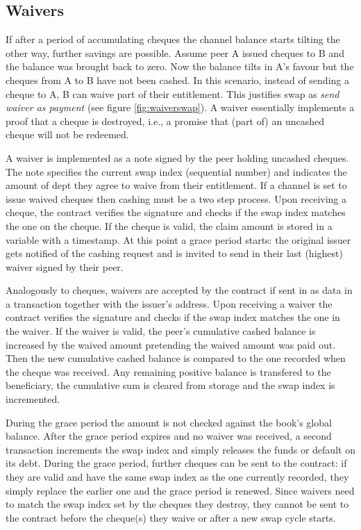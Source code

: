 \documentclass[a4paper,10pt]{article}
\begin{document}
\subsection{Waivers}

If after a period of accumulating cheques the channel balance starts tilting the other way,
further savings are possible.
Assume peer A issued cheques to B and the balance was brought back to zero.
Now the balance tilts in A's favour but the cheques from A to B have not been cashed.
In this scenario, instead of sending a cheque to A, B can waive part of their entitlement.
This justifies swap as \emph{send waiver as payment} (see figure \ref{fig:waiverswap}).
A waiver essentially implements a proof that a cheque is destroyed, i.e., a promise
that (part of) an uncashed cheque will not be redeemed.

A \gls{waiver} is implemented as a note signed by the peer holding uncashed cheques.
The note specifies the current \gls{swap index} (sequential number) and
indicates the amount of dept they agree to waive from their entitlement.
If a channel is set to issue waived cheques then cashing must be a two step process.
Upon receiving a cheque, the contract verifies the signature and checks if
the swap index matches the one on the cheque.
If the cheque is valid, the claim amount is stored in a variable with a timestamp.
At this point a grace period starts: the original issuer gets notified of the cashing
request and is invited to send in their last (highest) waiver signed by their peer.

Analogously to cheques, waivers are accepted by the contract if sent in as data in
a transaction together with the issuer's address.
Upon receiving a waiver the contract verifies the signature and
checks if the swap index matches the one in the waiver.
If the waiver is valid, the peer's cumulative cashed balance is increased by the waived amount
pretending the waived amount was paid out. Then the new cumulative cashed balance is
compared to the one recorded when the cheque was received. Any remaining positive balance
is transfered to the beneficiary, the cumulative sum is cleared from storage and
the swap index is incremented.

During the grace period the amount is not checked against the book's global balance.
After the grace period expires and no waiver was received, a second transaction
increments the swap index and simply releases the funds or default on its debt.
During the grace period, further cheques can be sent to the contract: if they are valid
and have the same swap index as the one currently recorded, they simply replace
the earlier one and the grace period is renewed.
Since waivers need to match the swap index set by the cheques they destroy, they cannot
be sent to the contract before the cheque(s) they waive or after a new swap cycle starts.
\end{document}
